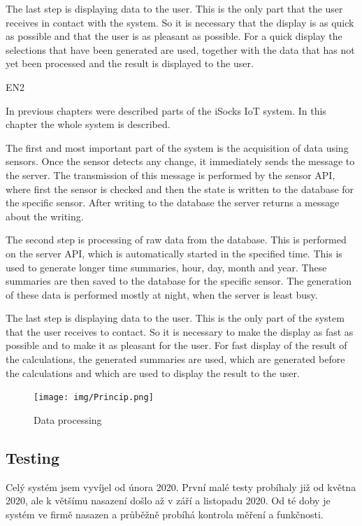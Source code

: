 \documentclass[12pt, a4paper]{article}
\begin{document}
The last step is displaying data to the user.
This is the only part that the user receives in contact with the system.
So it is necessary that the display is as quick as possible and that the user is as pleasant as possible.
For a quick display the selections that have been generated are used, together with the data that has not yet been processed and the result is displayed to the user.

EN2

In previous chapters were described parts of the iSocks IoT system.
In this chapter the whole system is described.

The first and most important part of the system is the acquisition of data using sensors.
Once the sensor detects any change, it immediately sends the message to the server.
The transmission of this message is performed by the sensor API, where first the sensor is checked and then the state is written to the database for the specific sensor.
After writing to the database the server returns a message about the writing.

The second step is processing of raw data from the database.
This is performed on the server API, which is automatically started in the specified time.
This is used to generate longer time summaries, hour, day, month and year.
These summaries are then saved to the database for the specific sensor.
The generation of these data is performed mostly at night, when the server is least busy.

The last step is displaying data to the user.
This is the only part of the system that the user receives to contact.
So it is necessary to make the display as fast as possible and to make it as pleasant for the user.
For fast display of the result of the calculations, the generated summaries are used, which are generated before the calculations and which are used to display the result to the user.



\begin{figure}[t]
    \centering
    \texttt{[image: img/Princip.png]}
    \caption{Data processing}
    \label{fig:princip}
\end{figure}


\subsection*{Testing}
Celý systém jsem vyvíjel od února 2020.
První malé testy probíhaly již od května 2020, ale k většímu nasazení došlo až v září a listopadu 2020.
Od té doby je systém ve firmě nasazen a průběžně probíhá kontrola měření a funkčnosti.
\end{document}
